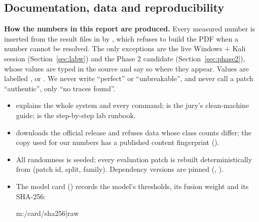 \subsection{Documentation, data and reproducibility}\label{sec:repro}
\textbf{How the numbers in this report are produced.} Every measured number is inserted from the result files in  by , which refuses to build the PDF when a number cannot be resolved. The only exceptions are the live Windows + Kali session (Section~\ref{sec:labw}) and the Phase 2 candidate (Section~\ref{sec:phase2}), whose values are typed in the source and say so where they appear. Values are labelled \meas, \targ{} or \notmeas. We never write ``perfect'' or ``unbreakable'', and never call a patch ``authentic'', only ``no traces found''.

\begin{itemize}
  \item {} explains the whole system and every command;  is the jury's clean-machine guide;  is the step-by-step lab runbook.
  \item {} downloads the official release and refuses data whose class counts differ; the copy used for our numbers has a published content fingerprint ().
  \item All randomness is seeded; every evaluation patch is rebuilt deterministically from (patch id, split, family). Dependency versions are pinned (, ).
  \item The model card () records the model's thresholds, its fusion weight and its SHA-256:
  \begin{center}\ttfamily\footnotesize {{m:/card/sha256|raw}}\end{center}
\end{itemize}

